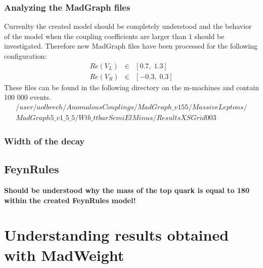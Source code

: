 \documentclass[a4paper,12pt]{report}
\begin{document}
\subsection{Analyzing the MadGraph files}\label{subsec:MadGraphFiles}
Currenlty the created model should be completely understood and the behavior of the model when the coupling coefficients are larger than $1$ should be investigated. Therefore new MadGraph files have been processed for the following configuration:
\begin{eqnarray*}
  Re(V_L) & \in & \left[  0.7, \; 1.3\right] \\
  Re(V_R) & \in & \left[ -0.3, \; 0.3\right]
\end{eqnarray*}
These files can be found in the following directory on the m-machines and contain 100 000 events.
\begin{eqnarray*}
  /user/aolbrech/AnomalousCouplings/MadGraph\_v155/MassiveLeptons/\\ MadGraph5\_v1\_5\_5/Wtb\_ttbarSemiElMinus/ResultsXSGrid003
\end{eqnarray*}

\subsection{Width of the decay}\label{subsec:DecayWidth}

\section{FeynRules}
\textbf{Should be understood why the mass of the top quark is equal to 180 within the created FeynRules model!}

\chapter{Understanding results obtained with MadWeight}
\end{document}
